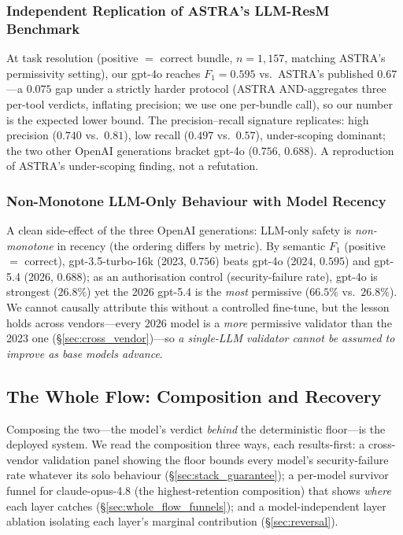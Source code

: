 \documentclass[sigconf,review,anonymous]{acmart}
\begin{document}
\subsubsection{Independent Replication of ASTRA's LLM-ResM Benchmark}
\label{sec:astra_replication}

At task resolution (positive $=$ correct bundle, $n=1{,}157$, matching ASTRA's permissivity setting), our gpt-4o reaches $F_1=0.595$ vs.\ ASTRA's published $0.67$---a $0.075$ gap under a strictly harder protocol (ASTRA AND-aggregates three per-tool verdicts, inflating precision; we use one per-bundle call), so our number is the expected lower bound. The precision--recall signature replicates: high precision ($0.740$ vs.\ $0.81$), low recall ($0.497$ vs.\ $0.57$), under-scoping dominant; the two other OpenAI generations bracket gpt-4o ($0.756$, $0.688$). A reproduction of ASTRA's under-scoping finding, not a refutation.

\subsubsection{Non-Monotone LLM-Only Behaviour with Model Recency}
\label{sec:newer_not_better}

A clean side-effect of the three OpenAI generations: LLM-only safety is \emph{non-monotone} in recency (the ordering differs by metric). By semantic $F_1$ (positive $=$ correct), gpt-3.5-turbo-16k (2023, $0.756$) beats gpt-4o (2024, $0.595$) and gpt-5.4 (2026, $0.688$); as an authorisation control (security-failure rate), gpt-4o is strongest ($26.8\%$) yet the 2026 gpt-5.4 is the \emph{most} permissive ($66.5\%$ vs.\ $26.8\%$). We cannot causally attribute this without a controlled fine-tune, but the lesson holds across vendors---every $2026$ model is a \emph{more} permissive validator than the 2023 one (\S\ref{sec:cross_vendor})---so \emph{a single-LLM validator cannot be assumed to improve as base models advance}.

\subsection{The Whole Flow: Composition and Recovery}
\label{sec:whole_flow}

Composing the two---the model's verdict \emph{behind} the deterministic floor---is the deployed system. We read the composition three ways, each results-first: a cross-vendor validation panel showing the floor bounds every model's security-failure rate whatever its solo behaviour (\S\ref{sec:stack_guarantee}); a per-model survivor funnel for claude-opus-4.8 (the highest-retention composition) that shows \emph{where} each layer catches (\S\ref{sec:whole_flow_funnels}); and a model-independent layer ablation isolating each layer's marginal contribution (\S\ref{sec:reversal}).
\end{document}
